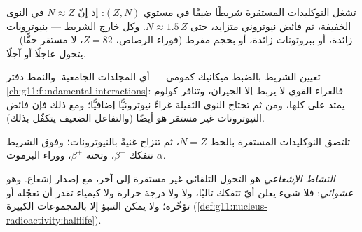 \begin{proposition}\label{prop:g11:nucleus-radioactivity:valley}
تشغل النوكليدات المستقرة شريطًا ضيقًا في مستوي $(Z, N)$: إذ إنّ $N \approx Z$
في النوى الخفيفة، ثم فائض نيوتروني متزايد، حتى $N \approx 1.5\,Z$.
وكل  خارج الشريط --- بنيوترونات زائدة، أو ببروتونات زائدة، أو
بحجم مفرط (فوراء الرصاص، $Z = 82$، لا  مستقر حقًّا) --- يتحول عاجلًا أو آجلًا.
\end{proposition}
\admitted

\begin{remark}
تعيين الشريط بالضبط ميكانيك كمومي --- أي المجلدات الجامعية.
والنمط دفتر \cref{ch:g11:fundamental-interactions}: فالغراء القوي
لا يربط إلا الجيران، وتنافر كولوم يمتد على  كلها، ومن ثم
تحتاج النوى الثقيلة غراءً نيوترونيًّا إضافيًّا؛ ومع ذلك فإن فائض النيوترونات غير مستقر
هو أيضًا (والتفاعل الضعيف يتكفّل بذلك).
\end{remark}

\begin{omfigure}

{\small تلتصق النوكليدات المستقرة بالخط $N = Z$، ثم تنزاح غنيةً بالنيوترونات؛ وفوق
الشريط تتفكك  $\beta^-$، وتحته $\beta^+$، ووراء البزموت $\alpha$.}
\end{omfigure}

\begin{definition}\label{def:g11:nucleus-radioactivity:radioactivity}
\emph{النشاط الإشعاعي} هو التحول التلقائي
 غير مستقرة إلى  آخر، مع إصدار إشعاع. وهو
\emph{عشوائي}: فلا شيء يعلن أيّ  تتفكك تاليًا، ولا
 ولا درجة حرارة ولا كيمياء تقدر أن تعجّله أو تؤخّره؛ ولا يمكن التنبؤ
إلا بالمجموعات الكبيرة (\cref{def:g11:nucleus-radioactivity:halflife}).
\end{definition}

